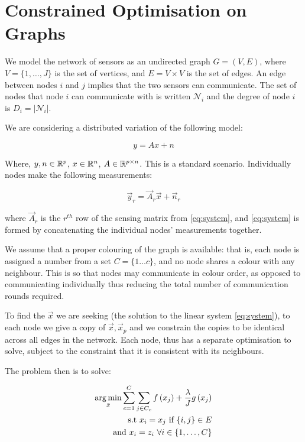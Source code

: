 \section{Constrained Optimisation on Graphs}\label{sec:opt-on-graphs}

We model the network of sensors as an undirected graph \(G = \left(V,E\right)\), where \(V = \{1, \ldots, J\}\) is the set of vertices, and \(E = V \times V\) is the set of edges. An edge between nodes \(i\) and \(j\) implies that the two sensors can communicate. The set of nodes that node \(i\) can communicate with is written \(\mathcal{N}_i\) and the degree of node \(i\) is \(D_i = |\mathcal{N}_i|\). 

We are considering a distributed variation of the following model:

\begin{equation}
y = A x + n
\end{equation}
\label{eq:system}

Where, \(y, n\in {\mathbb{R}}^{p}\), \(x \in {\mathbb{R}}^n\), \(A\in {\mathbb{R}}^{p \times n}\). This is a standard scenario. Individually nodes make the following measurements:

\begin{equation}
\vec{y}_r = \vec{A}_r\vec{x} + \vec{n}_r
\end{equation}

where \(\vec{A}_r\) is the \(r^{th} \) row of the sensing matrix from \eqref{eq:system}, and \eqref{eq:system} is formed by concatenating the individual nodes' measurements together.

We assume that a proper colouring of the graph is available: that is, each node is assigned a number from a set \(C = \{1 \ldots c \} \), and no node shares a colour with any neighbour. This is so that nodes may communicate in colour order, as opposed to communicating individually thus reducing the total number of communication rounds required. 

To find the \(\vec{x}\) we are seeking (the solution to the linear system \eqref{eq:system}), to each node we give a copy of \(\vec{x}, \vec{x}_p\) and we constrain the copies to be identical across all edges in the network. Each node, thus has a separate optimisation to solve, subject to the constraint that it is consistent with its neighbours.

The problem then is to solve:

\begin{align}
\operatorname*{arg\,min}_{\bar{x}} \sum_{c=1}^C \sum_{j \in C_c} f\left(x_j\right) + \frac{\lambda}{J} g\left(x_j\right) \nonumber \\ 
\text{ s.t } x_i = x_j \text{ if } \{i,j\} \in E \nonumber \\
\text{ and } x_i = z_i \text{ } \forall i \in \{1, \ldots, C\}
\label{constrainedbp}
\end{align}

